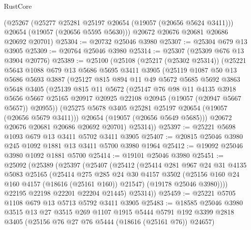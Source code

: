 \begin{lexlean}{RustCore}
\begin{coremodule}
      (@25267
        (@25277 @25281 @25197 @20654 (@19057 (@20656 @5624 @3411)))
        @20654
        (@19057 (@20656 @5595 @5630)))
      @20672
      @20676
      @20681
      @20686
      @20692
      @20701)
@25304 := @20732 @25046 @3980
@25307 := @25304 @679 @13 @3905
@25309 := @20764 @25046 @3980
@25314 := @25307 (@25309 @676 @13 @3904 @20776)
@25389 := @25100
    (@25108
      (@25217 (@25302 @25314))
      (@25221
        @5643
        @1088
        @679
        @13
        @5686
        @5695
        @3411
        @3905
        (@25119
          @1087
          @50
          @13
          @5686
          @5693
          @3887
          (@25127
            @815
            @894
            @11
            @49
            @5672
            @5685
            @5692
            @3863
            @5648
            @3405
            (@25139
              @815
              @11
              @5672
              (@25147
                @76
                @98
                @11
                @4135
                @3918
                @5656
                @5667
                @25165
                @20917
                @20925
                @22108
                @20945
                (@19057 (@20947 @5667 @5657))
                @20955))
            (@25275 @5678 @3405 @25281 @25197 @20654 (@19057 (@20656 @5679 @3411)))
            @20654
            (@19057 (@20656 @5649 @5685)))
          @20672
          @20676
          @20681
          @20686
          @20692
          @20701)
        @25314))
@25397 := @25221 @5698 @1093 @679 @13 @3411 @5702 @3411 @3905
@25407 := @20815 @25046 @3980 @245 @1092 @1881 @13 @3411 @5700 @3980 @1964
@25412 := @19092 @25046 @3980 @1092 @1881 @5700
@25414 := @19101 @25046 @3980
@25451 := @25092
    (@25389
      (@25397
        (@25407
          (@25412
            (@25414
              @281
              @967
              @24
              @31
              @4135
              @5083
              @25165
              (@25414
                @275
                @285
                @24
                @30
                @4157
                @3502
                (@25156 @160 @24 @160 @4157 (@18616 (@25161 @160)) @21547)
                (@19178 @25046 @3980))))
          @22195
          @22198
          @22201
          @22204
          @21445)
        @25314))
@25459 := @25221 @5705 @1108 @679 @13 @5713 @5792 @3411 @3905
@25483 := @18585
    @25046
    @3980
    @3515
    @13
    @27
    @3515
    @269
    @1107
    @1915
    @5444
    @5791
    @192
    @3399
    @2818
    @3405
    (@25156 @76 @27 @76 @5444 (@18616 (@25161 @76)) @24657)

\end{coremodule}
\end{lexlean}
